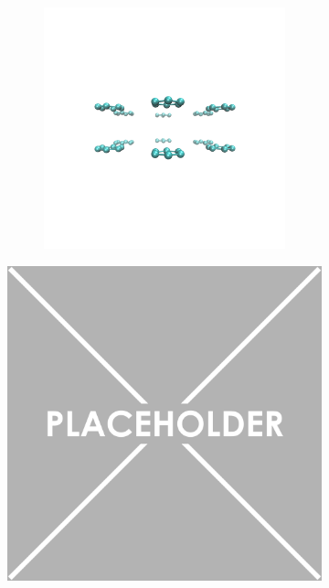 \documentclass{article}
\begin{document}
\begin{figure}[ht]
\begin{subfigure}{0.2\textwidth}
        \begin{subfigure}{\textwidth}
            \centering
            \includegraphics[width=\linewidth]{sidelayered.png}
        \end{subfigure}%
    \end{subfigure}%
    \begin{subfigure}{0.4\textwidth}
        \centering
        \includegraphics[width=\linewidth]{placeholder.png}

\end{subfigure}
\end{figure}
\end{document}
